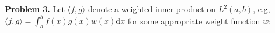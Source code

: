 \documentclass[14pt,a4paper]{article}
\begin{document}
\begin{enumerate}
\end{enumerate}

\label{Problem 3}
\large\textbf{Problem 3.} Let $\langle f,g\rangle$ denote a weighted inner product on $L^2(a,b)$, e.g, $\langle f,g\rangle = \int_{a}^{b}f(x)g(x)w(x)\mathrm{d}x$ for some appropriate weight function $w$: 
\end{document}
